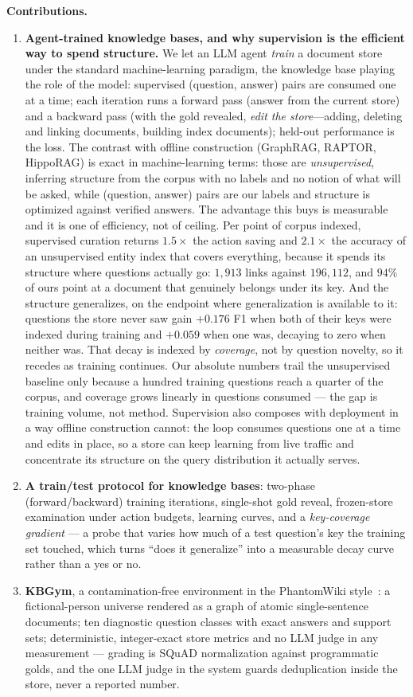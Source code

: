 \documentclass[conference]{IEEEtran}
\newcommand{\kbgym}{KBGym}
\begin{document}
\textbf{Contributions.}
\begin{enumerate}
\item \textbf{Agent-trained knowledge bases, and why supervision is the
efficient way to spend structure.} We let an LLM agent \emph{train} a
document store under the standard machine-learning paradigm, the knowledge
base playing the role of the model: supervised (question, answer) pairs are
consumed one at a time; each iteration runs a forward pass (answer from the
current store) and a backward pass (with the gold revealed, \emph{edit the
store}---adding, deleting and linking documents, building index documents);
held-out performance is the loss. The contrast with offline construction
(GraphRAG, RAPTOR, HippoRAG) is exact in machine-learning terms: those are
\emph{unsupervised}, inferring structure from the corpus with no labels and
no notion of what will be asked, while (question, answer) pairs are our
labels and structure is optimized against verified answers. The advantage
this buys is measurable and it is one of efficiency, not of ceiling. Per
point of corpus indexed, supervised curation returns $1.5\times$ the action
saving and $2.1\times$ the accuracy of an unsupervised entity index that
covers everything, because it spends its structure where questions actually
go: $1{,}913$ links against $196{,}112$, and $94\%$ of ours point at a
document that genuinely belongs under its key. And the structure generalizes, on the endpoint where generalization is
available to it: questions the store never saw gain $+0.176$ F1 when both of
their keys were indexed during training and $+0.059$ when one was, decaying
to zero when neither was. That decay is indexed by \emph{coverage}, not by
question novelty, so it recedes as training continues. Our absolute numbers
trail the unsupervised baseline only because a hundred training questions
reach a quarter of the corpus, and coverage grows linearly in questions
consumed --- the gap is training volume, not method. Supervision also composes with deployment in a
way offline construction cannot: the loop consumes questions one at a time
and edits in place, so a store can keep learning from live traffic and
concentrate its structure on the query distribution it actually serves.
\item \textbf{A train/test protocol for knowledge bases}: two-phase
(forward/backward) training iterations, single-shot gold reveal,
frozen-store examination under action budgets, learning curves, and a
\emph{key-coverage gradient} --- a probe that varies how much of a test
question's key the training set touched, which turns ``does it generalize''
into a measurable decay curve rather than a yes or no.
\item \textbf{\kbgym}, a contamination-free environment in the PhantomWiki
style~\cite{phantomwiki}: a fictional-person universe rendered as a graph of
atomic single-sentence documents; ten diagnostic question classes with exact
answers and support sets; deterministic, integer-exact store metrics and no
LLM judge in any measurement --- grading is SQuAD normalization against
programmatic golds, and the one LLM judge in the system guards
deduplication inside the store, never a reported number.
\end{enumerate}
\end{document}
